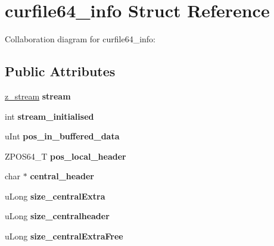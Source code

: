 \hypertarget{structcurfile64__info}{\section{curfile64\+\_\+info Struct Reference}
\label{structcurfile64__info}
}


Collaboration diagram for curfile64\+\_\+info\+:
\subsection*{Public Attributes}
\begin{DoxyCompactItemize}
\item 
\hypertarget{structcurfile64__info_a765936b069e6e2be6d85589614af8583}{\hyperlink{structz__stream__s}{z\+\_\+stream} {\bfseries stream}}\label{structcurfile64__info_a765936b069e6e2be6d85589614af8583}

\item 
\hypertarget{structcurfile64__info_a43c3fdea776df57014ea61d952972b94}{int {\bfseries stream\+\_\+initialised}}\label{structcurfile64__info_a43c3fdea776df57014ea61d952972b94}

\item 
\hypertarget{structcurfile64__info_a208198f19c7d165203225903455478fd}{u\+Int {\bfseries pos\+\_\+in\+\_\+buffered\+\_\+data}}\label{structcurfile64__info_a208198f19c7d165203225903455478fd}

\item 
\hypertarget{structcurfile64__info_a6225decff0849b90f09a63addab95c64}{Z\+P\+O\+S64\+\_\+\+T {\bfseries pos\+\_\+local\+\_\+header}}\label{structcurfile64__info_a6225decff0849b90f09a63addab95c64}

\item 
\hypertarget{structcurfile64__info_aa090dd081d0cf805614041c6a5a4438f}{char $\ast$ {\bfseries central\+\_\+header}}\label{structcurfile64__info_aa090dd081d0cf805614041c6a5a4438f}

\item 
\hypertarget{structcurfile64__info_ab4c965d0fe696204fe23e4efd0cc2edb}{u\+Long {\bfseries size\+\_\+central\+Extra}}\label{structcurfile64__info_ab4c965d0fe696204fe23e4efd0cc2edb}

\item 
\hypertarget{structcurfile64__info_a17de1df264e0e162f777f2ae7cef0d55}{u\+Long {\bfseries size\+\_\+centralheader}}\label{structcurfile64__info_a17de1df264e0e162f777f2ae7cef0d55}

\item 
\hypertarget{structcurfile64__info_a885ce2d7f41cbac1a2ef990643e62069}{u\+Long {\bfseries size\+\_\+central\+Extra\+Free}}\label{structcurfile64__info_a885ce2d7f41cbac1a2ef990643e62069}


\end{DoxyCompactItemize}
